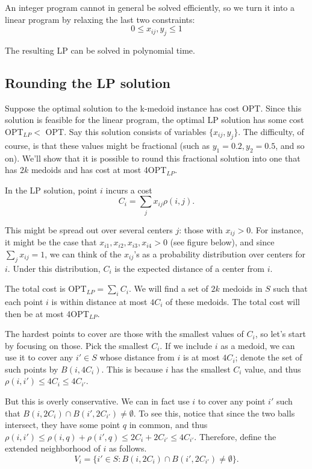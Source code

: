 \documentclass{article}
\begin{document}
An integer program cannot in general be solved efficiently, so we turn it into a linear program by relaxing the last two constraints:
\begin{equation*}
0 \le x_{ij}, y_j \le 1
\end{equation*}

The resulting LP can be solved in polynomial time.

\subsection{Rounding the LP solution}

Suppose the optimal solution to the k-medoid instance has cost OPT. Since this solution is feasible for the linear program, the optimal LP solution has some cost OPT$_{LP} <$ OPT. Say this solution consists of variables $\{x_{ij}, y_j\}$. The difficulty, of course, is that these values might be fractional (such as $y_1 = 0.2, y_2 = 0.5$, and so on). We'll show that it is possible to round this fractional solution into one that has $2k$ medoids and has cost at most 4OPT$_{LP}$.

In the LP solution, point $i$ incurs a cost
\begin{equation*}
C_i = \sum_j x_{ij} \rho(i, j).
\end{equation*}

This might be spread out over several centers $j$: those with $x_{ij} > 0$. For instance, it might be the case that $x_{i1}, x_{i2}, x_{i3}, x_{i4} > 0$ (see figure below), and since $\sum_j x_{ij} = 1$, we can think of the $x_{ij}$'s as a probability distribution over centers for $i$. Under this distribution, $C_i$ is the expected distance of a center from $i$.

The total cost is OPT$_{LP} = \sum_i C_i$. We will find a set of $2k$ medoids in $S$ such that each point $i$ is within distance at most $4C_i$ of these medoids. The total cost will then be at most 4OPT$_{LP}$.

The hardest points to cover are those with the smallest values of $C_i$, so let's start by focusing on those. Pick the smallest $C_i$. If we include $i$ as a medoid, we can use it to cover any $i' \in S$ whose distance from $i$ is at most $4C_i$; denote the set of such points by $B(i, 4C_i)$. This is because $i$ has the smallest $C_i$ value, and thus $\rho(i, i') \le 4C_i \le 4C_{i'}$.

But this is overly conservative. We can in fact use $i$ to cover any point $i'$ such that $B(i, 2C_i) \cap B(i', 2C_{i'}) \ne \emptyset$. To see this, notice that since the two balls intersect, they have some point $q$ in common, and thus $\rho(i, i') \le \rho(i, q) + \rho(i', q) \le 2C_i + 2C_{i'} \le 4C_{i'}$. Therefore, define the extended neighborhood of $i$ as follows.
\begin{equation*}
V_i = \{i' \in S : B(i, 2C_i) \cap B(i', 2C_{i'}) \ne \emptyset\}.
\end{equation*}
\end{document}
